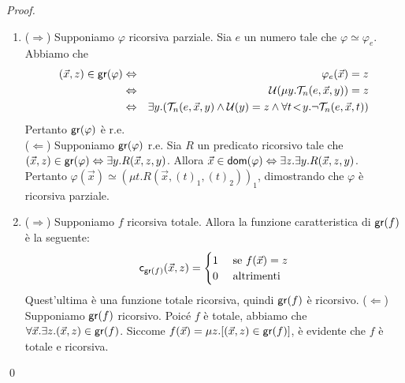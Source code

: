 \documentclass[runningheads,a4paper]{llncs}
\begin{document}
\begin{proof}
\begin{enumerate}[label=(\roman*)]
\item ($\Rightarrow$) Supponiamo $\varphi$ ricorsiva parziale. Sia $e$ un numero tale che $\varphi \simeq \varphi_e$. Abbiamo che 
\begin{eqnarray*}
(\vec x, z) \in \mathsf{gr}(\varphi) & \Leftrightarrow & \varphi_e(\vec x) = z \\
                              & \Leftrightarrow & \mathcal{U}(\mu y.\mathcal{T}_n(e,\vec x,y)) = z \\
                              & \Leftrightarrow & \exists y.(\mathcal{T}_n(e,\vec x,y) \wedge \mathcal{U}(y) = z \wedge \forall{t}\!<\!{y}.\neg\mathcal{T}_n(e,\vec x,t)) \\
\end{eqnarray*}
Pertanto $\mathsf{gr}(\varphi)$ \`{e} r.e.\\
\noindent ($\Leftarrow$) Supponiamo $\mathsf{gr}(\varphi)$ r.e. Sia $R$ un predicato ricorsivo tale che
 $(\vec x, z) \in \mathsf{gr}(\varphi) \Leftrightarrow \exists y.R(\vec x,z,y)$. Allora $\vec x \in \mathsf{dom}(\varphi) \Leftrightarrow \exists z.\exists y.R(\vec x,z,y)$.
 Pertanto $\varphi(\vec x) \simeq (\mu t.R(\vec x,(t)_1,(t)_2))_1$, dimostrando che $\varphi$ \`{e} ricorsiva parziale.

\item ($\Rightarrow$) Supponiamo $f$ ricorsiva totale. Allora la funzione caratteristica di $\mathsf{gr}(f)$ \`{e} la seguente:
$$
\mathsf{c}_{\mathsf{gr}(f)}(\vec x,z) =
\begin{cases}
1 & \mbox{ se } f(\vec x)=z \\
0 & \mbox{ altrimenti} \\ 
\end{cases}
$$
Quest'ultima \`{e} una funzione totale ricorsiva, quindi $\mathsf{gr}(f)$ \`{e} ricorsivo.
\noindent ($\Leftarrow$) Supponiamo $\mathsf{gr}(f)$ ricorsivo. Poic\'{e} $f$ \`{e} totale, abbiamo che $\forall \vec x.\exists z.(\vec x,z) \in \mathsf{gr}(f)$.
 Siccome $f(\vec x) = \mu z.[(\vec x,z) \in \mathsf{gr}(f)]$, \`{e} evidente che $f$ \`{e} totale e ricorsiva.
\end{enumerate}
\qed\end{proof}


%
\end{document}
